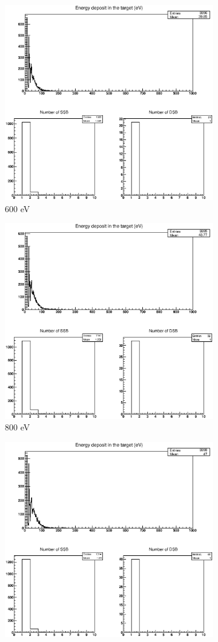 \begin{figure}
\begin{subfigure}{.5\textwidth}
  \includegraphics[width=.78\linewidth]{./Figures/33.eps}
  \caption{600 eV}
  \label{fig:subi3}
\end{subfigure}%
\begin{subfigure}{.5\textwidth}
  \centering
  \includegraphics[width=.78\linewidth]{./Figures/44.eps}
  \caption{800 eV}
  \label{fig:subi4}
\end{subfigure}
\begin{subfigure}{.5\textwidth}
  \centering
  \includegraphics[width=.78\linewidth]{./Figures/55.eps}

\end{subfigure}
\end{figure}
